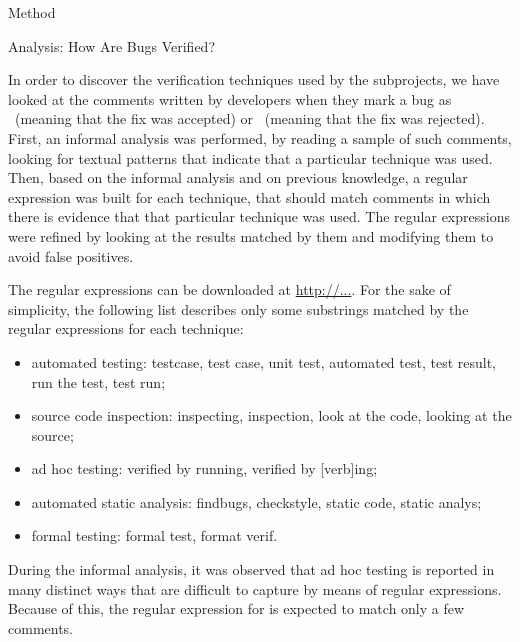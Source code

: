\begin{section}{Method}
\begin{subsection}{Analysis: How Are Bugs Verified?}

	In order to discover the verification techniques used by the subprojects, we have looked at the comments written by developers when they mark a bug as \VERIFIED\ (meaning that the fix was accepted) or \REOPENED\ (meaning that the fix was rejected). First, an informal analysis was performed, by reading a sample of such comments, looking for textual patterns that indicate that a particular technique was used. Then, based on the informal analysis and on previous knowledge, a regular expression was built for each technique, that should match comments in which there is evidence that that particular technique was used. The regular expressions were refined by looking at the results matched by them and modifying them to avoid false positives. 
	
	The regular expressions can be downloaded at \url{http://...}. For the sake of simplicity, the following list describes only some substrings matched by the regular expressions for each technique:
		
	\begin{itemize}
		\item automated testing: testcase, test case, unit test, automated test, test result, run the test, test run;
		\item source code inspection: inspecting, inspection, look at the code, looking at the source;
		\item ad hoc testing: verified by running, verified by [verb]ing;
		\item automated static analysis: findbugs, checkstyle, static code, static analys;
		\item formal testing: formal test, format verif.
	\end{itemize}
	
	
	During the informal analysis, it was observed that ad hoc testing is reported in many distinct ways that are difficult to capture by means of regular expressions. Because of this, the regular expression for is expected to match only a few comments.
	
	

\end{subsection}
\end{section}
